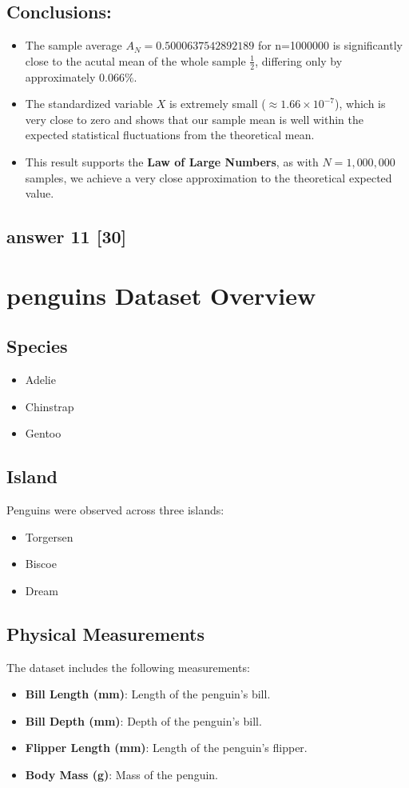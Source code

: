 \documentclass[12pt]{article}
\begin{document}
\subsection*{Conclusions:}
\begin{itemize}
    \item The sample average \( A_N = 0.5000637542892189 \) for n=1000000 is significantly close to the acutal mean of the whole sample \( \frac{1}{2} \), differing only by approximately \( 0.066\% \).
    \item The standardized variable \( X \) is extremely small (\( \approx 1.66 \times 10^{-7} \)), which is very close to zero and shows that our sample mean is well within the expected statistical fluctuations from the theoretical mean.
    \item This result supports the \textbf{Law of Large Numbers}, as with \( N = 1,000,000 \) samples, we achieve a very close approximation to the theoretical expected value.
\end{itemize}

\subsection*{answer 11 [30]}
\section*{penguins Dataset Overview}

\subsection*{Species}
\begin{itemize}
    \item Adelie
    \item Chinstrap
    \item Gentoo
\end{itemize}

\subsection*{Island}
Penguins were observed across three islands:
\begin{itemize}
    \item Torgersen
    \item Biscoe
    \item Dream
\end{itemize}

\subsection*{Physical Measurements}
The dataset includes the following measurements:
\begin{itemize}
    \item \textbf{Bill Length (mm)}: Length of the penguin’s bill.
    \item \textbf{Bill Depth (mm)}: Depth of the penguin’s bill.
    \item \textbf{Flipper Length (mm)}: Length of the penguin’s flipper.
    \item \textbf{Body Mass (g)}: Mass of the penguin.
\end{itemize}
\end{document}
